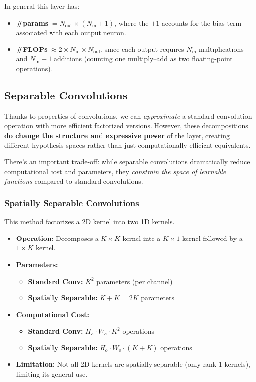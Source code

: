 In general this layer has:
\begin{itemize}
    \item \textbf{\#params} $= N_\text{out} \times (N_\text{in} + 1)$,  
    where the $+1$ accounts for the bias term associated with each output neuron.

    \item \textbf{\#FLOPs} $\approx 2 \times N_\text{in} \times N_\text{out}$,  
    since each output requires $N_\text{in}$ multiplications and $N_\text{in}-1$ additions (counting one multiply–add as two floating-point operations).
\end{itemize}



\subsection{Separable Convolutions}

Thanks to properties of convolutions, we can \textit{approximate} a standard convolution operation with more efficient factorized versions. However, these decompositions \textbf{do change the structure and expressive power} of the layer, creating different hypothesis spaces rather than just computationally efficient equivalents.

There's an important trade-off: while separable convolutions dramatically reduce computational cost and parameters, they \textit{constrain the space of learnable functions} compared to standard convolutions.

\subsubsection{Spatially Separable Convolutions}

This method factorizes a 2D kernel into two 1D kernels.

\begin{itemize}
    \item \textbf{Operation:} Decomposes a $K \times K$ kernel into a $K \times 1$ kernel followed by a $1 \times K$ kernel.
    \item \textbf{Parameters:}
    \begin{itemize}
        \item \textbf{Standard Conv:} $K^2$ parameters (per channel)
        \item \textbf{Spatially Separable:} $K + K = 2K$ parameters
    \end{itemize}
    \item \textbf{Computational Cost:}
    \begin{itemize}
        \item \textbf{Standard Conv:} $H_o \cdot W_o \cdot K^2$ operations
        \item \textbf{Spatially Separable:} $H_o \cdot W_o \cdot (K + K)$ operations
    \end{itemize}
    \item \textbf{Limitation:} Not all 2D kernels are spatially separable (only rank-1 kernels), limiting its general use.
\end{itemize}


